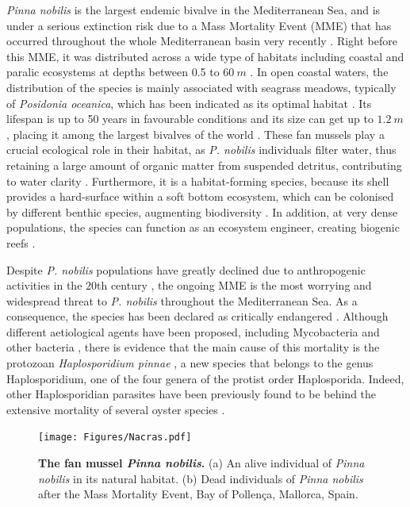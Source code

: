 \textit{Pinna nobilis} is the largest endemic bivalve in the Mediterranean Sea,
and is under a serious extinction risk due to a Mass Mortality Event (MME) that
has occurred throughout the whole Mediterranean basin very recently
\cite{March, ZOTOU2020, VAZQUEZ2017}. Right before this
MME, it was distributed across a wide type of habitats including coastal and
paralic ecosystems at depths between 0.5 to $\SI{60}{m}$
\cite{butler1993ecology, PRADO2020105220}. In open coastal waters, the
distribution of the species is mainly associated with seagrass meadows,
typically of \textit{Posidonia oceanica}, which has been indicated as its
optimal habitat \cite{Hendriks2011}. Its lifespan is up to 50 years in
favourable conditions and its size can get up to $\SI{1.2}{m}$, placing it
among the largest bivalves of the  world \cite{Cabanellas2019}. These fan
mussels play a crucial ecological role in their habitat, as \textit{P. nobilis}
individuals filter water, thus retaining a large amount of organic matter from
suspended detritus, contributing to water clarity \cite{TRIGOS2014}.
Furthermore, it is a habitat-forming species, because its shell provides a
hard-surface within a soft bottom ecosystem, which can be colonised by
different benthic species, augmenting biodiversity \cite{Cabanellas2019}. In
addition, at very dense populations, the species can function as an ecosystem
engineer, creating biogenic reefs \cite{katsanevakis2016transplantation}.

Despite \textit{P. nobilis} populations have greatly declined due to
anthropogenic activities in the $20$th century \cite{VAZQUEZ2017}, the ongoing
MME is the most worrying and widespread threat to \textit{P. nobilis}
throughout the Mediterranean Sea. As a consequence, the species has been
declared as critically endangered \cite{IUCN}. Although different aetiological
agents have been proposed, including Mycobacteria and other bacteria
\cite{Carella2019, Saric2020, Scarpa2020}, there is evidence that the main
cause of this mortality is the protozoan \textit{Haplosporidium pinnae}
\cite{DARRIBA201714, CATANESE20189, Box2020}, a new species that belongs to
the genus Haplosporidium, one of the four genera of the protist order
Haplosporida. Indeed, other Haplosporidian parasites have been previously found
to be behind the extensive mortality of several oyster species
\cite{Burreson2004, Arzul2015}.

\begin{figure}[H]
  \centering
  \texttt{[image: Figures/Nacras.pdf]}
  \caption[The fan mussel \textit{Pinna nobilis}]{
    \textbf{The fan mussel \textit{Pinna nobilis}.} (a) An alive individual of
    \textit{Pinna nobilis} in its natural habitat. (b) Dead individuals of
    \textit{Pinna nobilis} after the Mass Mortality Event, Bay of Pollença,
    Mallorca, Spain.}
  \label{fig:Pinna_nobilis}
\end{figure}

